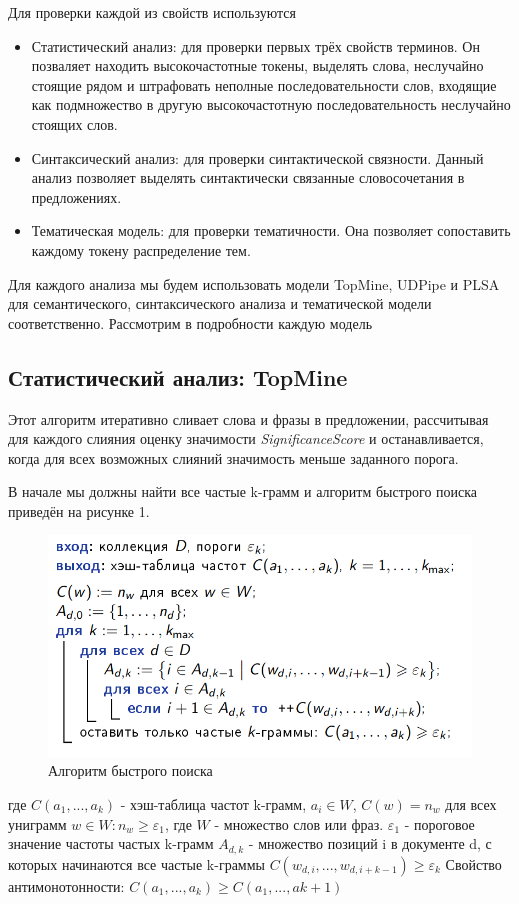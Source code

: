 Для проверки каждой из свойств используются 

\begin{itemize}
	\item Статистический анализ: для проверки первых трёх свойств терминов. Он позваляет находить высокочастотные токены, выделять слова, неслучайно стоящие рядом и штрафовать неполные последовательности слов, входящие как подмножество в другую высокочастотную последовательность неслучайно стоящих слов.
	\item Синтаксический анализ: для проверки синтактической связности. Данный анализ позволяет выделять синтактически связанные словосочетания в предложениях.
	\item Тематическая модель: для проверки тематичности. Она позволяет сопоставить каждому токену распределение тем.
\end{itemize}

Для каждого анализа мы будем использовать модели TopMine, UDPipe и PLSA для семантического, синтаксического анализа и тематической модели соответственно. Рассмотрим в подробности каждую модель

\subsection*{Статистический анализ: TopMine}

Этот алгоритм итеративно сливает слова и фразы в предложении, рассчитывая для каждого слияния оценку значимости \textit{SignificanceScore} и останавливается, когда для всех возможных слияний значимость меньше заданного порога. 

В начале мы должны найти все частые k-грамм и алгоритм быстрого поиска приведён на рисунке 1.
\begin{figure}
    \includegraphics[scale = 0.5]{chapters/rules/images/ml1.png}
    \caption{Алгоритм быстрого поиска}
\end{figure}
где $C(a_{1},...,a_{k})$ - хэш-таблица частот k-грамм, $a_{i} \in W$, $C(w) = n_{w}$ для всех униграмм $w \in W: n_{w} \geq \varepsilon_{1}$, где $W$ - множество слов или фраз.
$\varepsilon_{1}$ - пороговое значение частоты частых k-грамм
$A_{d,k}$ - множество позиций i в документе d, с которых начинаются все частые k-граммы
$C(w_{d,i},...,w_{d,i+k-1}) \geq \varepsilon_{k}$
Свойство антимонотонности: $C(a_{1},...,a_{k}) \geq C(a_{1},...,a{k+1})$

